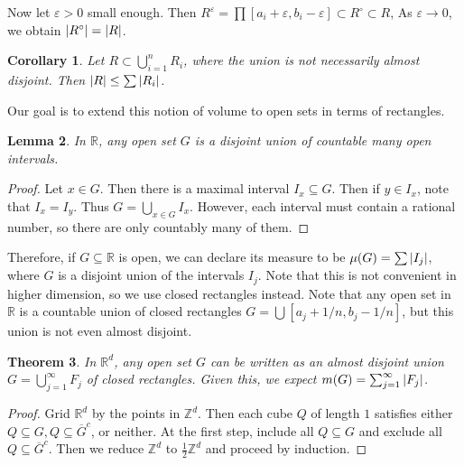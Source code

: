 \documentclass[leqno, openany]{memoir}
\newtheorem{thm}{Theorem}[chapter]
\newtheorem{cor}[thm]{Corollary}
\newtheorem{lem}[thm]{Lemma}
\theoremstyle{definition}
\theoremstyle{remark}
\theoremstyle{plain}
\theoremstyle{definition}
\theoremstyle{remark}
\newcommand{\R}{\mathbb{R}}
\newcommand{\Z}{\mathbb{Z}}
\newcommand{\ep}{\varepsilon}
\newcommand{\ol}[1]{\overline{#1}}
\begin{document}
Now let $\ep > 0$ small enough. Then $R^{\ep} = \prod [a_i + \ep, b_i - \ep]
\subset R^{\circ} \subset R$, As $\ep \to 0$, we obtain $\abs{R^{\circ}} =
\abs{R}$.

\begin{cor} Let $R \subset \bigcup_{i=1}^n R_i$, where the union is not
necessarily almost disjoint. Then $\abs{R} \leq \sum \abs{R_i}$.  \end{cor}

Our goal is to extend this notion of volume to open sets in terms of
rectangles.

\begin{lem} In $\R$, any open set $G$ is a disjoint union of countable many
open intervals.  \end{lem}

\begin{proof} Let $x \in G$. Then there is a maximal interval $I_x \subseteq
    G$. Then if $y \in I_x$, note that $I_x = I_y$. Thus $G = \bigcup_{x \in G}
    I_x$. However, each interval must contain a rational number, so there are
    only countably many of them.  \end{proof}

Therefore, if $G \subseteq \R$ is open, we can declare its measure to be
$\mu(G) = \sum \abs{I_j}$, where $G$ is a disjoint union of the intervals
$I_j$. Note that this is not convenient in higher dimension, so we use closed
rectangles instead. Note that any open set in $\R$ is a countable union of
closed rectangles $G = \bigcup [a_j + 1/n, b_j - 1/n]$, but this union is not
even almost disjoint.

\begin{thm} In $\R^d$, any open set $G$ can be written as an almost disjoint
union $G = \bigcup_{j=1}^{\infty} F_j$ of closed rectangles. Given this, we
expect $m(G) = \sum_{j=1}^{\infty} \abs{F_j}$.  \end{thm}

\begin{proof} Grid $\R^d$ by the points in $\Z^d$. Then each cube $Q$ of length
    $1$ satisfies either $Q \subseteq G, Q \subseteq \ol{G}^c$, or neither. At
    the first step, include all $Q \subseteq G$ and exclude all $Q \subseteq
    \ol{G}^c$. Then we reduce $\Z^d$ to $\frac{1}{2} \Z^d$ and proceed by
    induction.  \end{proof}
\end{document}
